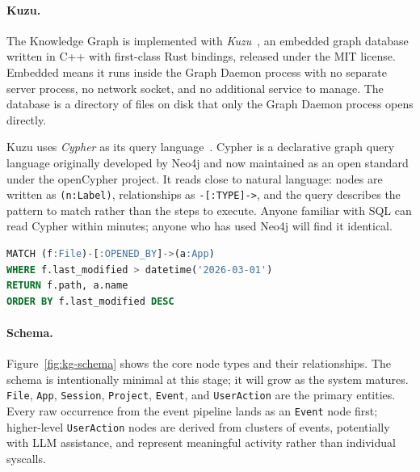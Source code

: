 \paragraph{Kuzu.}
The Knowledge Graph is implemented with \emph{Kuzu}~\cite{kuzu}, an embedded
graph database written in C++ with first-class Rust bindings, released under
the MIT license. Embedded means it runs inside the Graph Daemon process with no
separate server process, no network socket, and no additional service to manage.
The database is a directory of files on disk that only the Graph Daemon process
opens directly.

Kuzu uses \emph{Cypher} as its query language~\cite{opencypher}. Cypher is a
declarative graph query language originally developed by Neo4j and now
maintained as an open standard under the openCypher project. It reads close to
natural language: nodes are written as \texttt{(n:Label)}, relationships as
\texttt{-[:TYPE]->}, and the query describes the pattern to match rather than
the steps to execute. Anyone familiar with SQL can read Cypher within minutes;
anyone who has used Neo4j will find it identical.

\begin{lstlisting}[language=SQL, caption={Example Cypher query: files accessed last Tuesday}]
MATCH (f:File)-[:OPENED_BY]->(a:App)
WHERE f.last_modified > datetime('2026-03-01')
RETURN f.path, a.name
ORDER BY f.last_modified DESC
\end{lstlisting}

\paragraph{Schema.}
Figure~\ref{fig:kg-schema} shows the core node types and their relationships.
The schema is intentionally minimal at this stage; it will grow as the system
matures. \texttt{File}, \texttt{App}, \texttt{Session}, \texttt{Project},
\texttt{Event}, and \texttt{UserAction} are the primary entities. Every raw
occurrence from the event pipeline lands as an \texttt{Event} node first;
higher-level \texttt{UserAction} nodes are derived from clusters of events,
potentially with LLM assistance, and represent meaningful activity rather than
individual syscalls.


